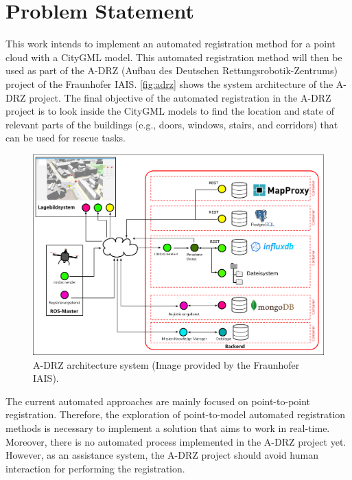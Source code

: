     \section{Problem Statement}
        This work intends to implement an automated registration method for a point cloud with a CityGML model.
        This automated registration method will then be used as part of the A-DRZ (Aufbau des Deutschen Rettungsrobotik-Zentrums) \cite{A-DRZ_online} project of the Fraunhofer IAIS.
        \autoref{fig:adrz} shows the system architecture of the A-DRZ project. 
        The final objective of the automated registration in the A-DRZ project is to look inside the CityGML models
        to find the location and state of relevant parts of the buildings (e.g., doors, windows, stairs, and corridors) that can be used for rescue tasks.
        
        \begin{figure}[htp]
            \includegraphics[width=\textwidth]{images/Systemaufbau.png}
            \caption{A-DRZ architecture system (Image provided by the Fraunhofer IAIS).}
            \label{fig:adrz}
        \end{figure}

        The current automated approaches are mainly focused on point-to-point registration.
        Therefore, the exploration of point-to-model automated registration methods is necessary to implement a solution that aims to work in real-time.
        Moreover, there is no automated process implemented in the A-DRZ project yet. 
        However, as an assistance system, the A-DRZ project should avoid human interaction for performing the registration.

